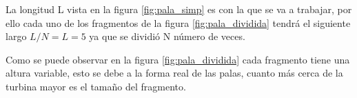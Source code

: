 La longitud L vista en la figura \ref{fig:pala_simp} es con la que se va a trabajar, por ello cada uno de los fragmentos de la figura \ref{fig:pala_dividida} tendrá el siguiente largo $L/N = L = 5$ ya que se dividió N número de veces.


Como se puede observar en la figura \ref{fig:pala_dividida} cada fragmento tiene una altura variable, esto se debe a la forma real de las palas, cuanto más cerca de la turbina mayor es el tamaño del fragmento. 


